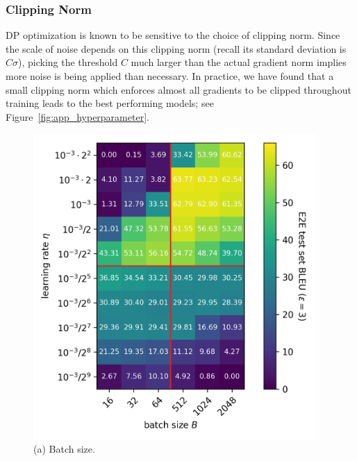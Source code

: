 
\subsubsection{Clipping Norm}
DP optimization is known to be sensitive to the choice of clipping norm.
Since the scale of noise depends on this clipping norm (recall its standard deviation is $C \sigma$), picking the threshold $C$ much larger than the actual gradient norm implies more noise is being applied than necessary.
In practice, we have found that a small clipping norm which enforces almost all gradients to be clipped throughout training leads to the best performing models; see Figure~\ref{fig:app_hyperparameter}.

\begin{figure}[H]
\begin{center}
\begin{minipage}[t]{0.48\linewidth}
\centering
\includegraphics[width=0.96\textwidth]{figs/bs_vs_lr_BLEU_v2_cropped.png} \\ \vspace{-0.10cm}
(a) Batch size.
\end{minipage}
\begin{minipage}[t]{0.48\linewidth}
\centering

\end{minipage}
\end{center}
\end{figure}
